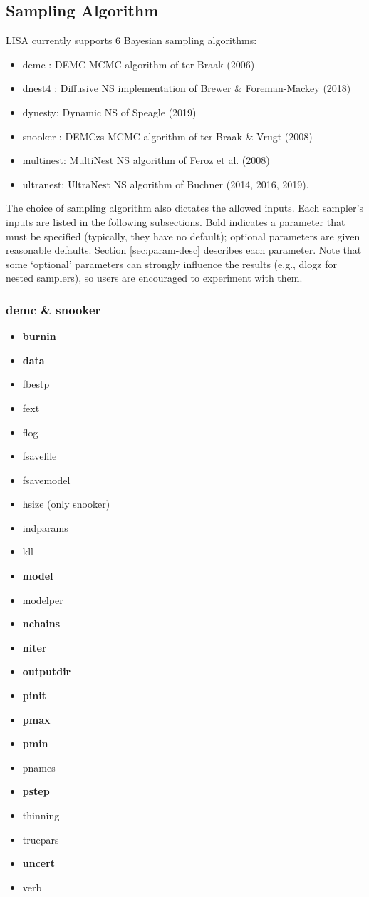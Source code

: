 \documentclass[letterpaper, 12pt]{article}
\begin{document}
\subsection{Sampling Algorithm}

LISA currently supports 6 Bayesian sampling algorithms:
\begin{itemize}
\item demc   : DEMC MCMC algorithm of ter Braak (2006)
\item dnest4 : Diffusive NS implementation of Brewer & Foreman-Mackey (2018)
\item dynesty: Dynamic NS of Speagle (2019)
\item snooker  : DEMCzs MCMC algorithm of ter Braak \& Vrugt (2008)
\item multinest: MultiNest NS algorithm of Feroz et al. (2008)
\item ultranest: UltraNest NS algorithm of Buchner (2014, 2016, 2019).
\end{itemize}

\noindent The choice of sampling algorithm also dictates the allowed inputs.  
Each sampler's inputs are listed in the following subsections.  Bold 
indicates a parameter that must be specified (typically, they have no default); 
optional parameters are given reasonable defaults.  Section 
\ref{sec:param-desc} describes each parameter.  Note that some `optional' 
parameters can strongly influence the results (e.g., dlogz for nested samplers),
so users are encouraged to experiment with them.

\subsubsection{demc \& snooker}
\label{sec:mcmc-inputs}
\begin{itemize}
\item \textbf{burnin}
\item \textbf{data}
\item fbestp
\item fext
\item flog
\item fsavefile
\item fsavemodel
\item hsize (only snooker)
\item indparams
\item kll
\item \textbf{model}
\item modelper
\item \textbf{nchains}
\item \textbf{niter}
\item \textbf{outputdir}
\item \textbf{pinit}
\item \textbf{pmax}
\item \textbf{pmin}
\item pnames
\item \textbf{pstep}
\item thinning
\item truepars
\item \textbf{uncert}
\item verb
\end{itemize}
\end{document}
